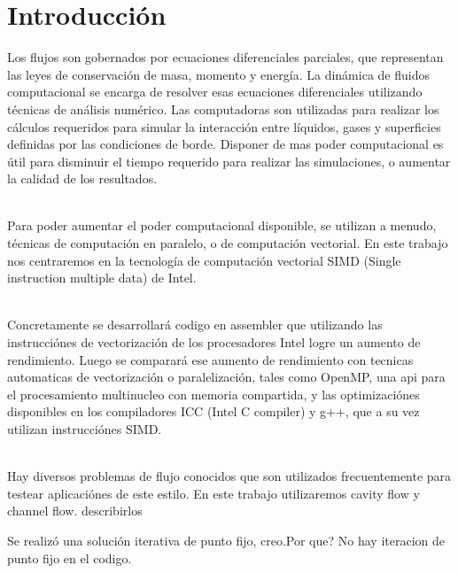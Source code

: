 \section{Introducción}%
Los flujos son gobernados por ecuaciones diferenciales parciales, que representan las leyes de conservación de masa, momento y energía. La dinámica de fluidos computacional se encarga de resolver esas ecuaciones diferenciales utilizando técnicas de análisis numérico. Las computadoras son utilizadas para realizar los cálculos requeridos para simular la interacción entre líquidos, gases y superficies definidas por las condiciones de borde. Disponer de mas poder computacional es útil para disminuir el tiempo requerido para realizar las simulaciones, o aumentar la calidad de los resultados.

~\\
Para poder aumentar el poder computacional disponible, se utilizan a menudo, técnicas de computación en paralelo, o de computación vectorial. En este trabajo nos centraremos en la tecnología de computación vectorial SIMD (Single instruction multiple data) de Intel.

~\\
Concretamente se desarrollará codigo en assembler que utilizando las instrucciónes de vectorización de los procesadores Intel logre un aumento de rendimiento. Luego se comparará ese aumento de rendimiento con tecnicas automaticas de vectorización o paralelización, tales como OpenMP, una api para el procesamiento multinucleo con memoria compartida, y las optimizaciónes disponibles en los compiladores ICC (Intel C compiler) y g++, que a su vez utilizan instrucciónes SIMD.

~\\
Hay diversos problemas de flujo conocidos que son utilizados frecuentemente para testear aplicaciónes de este estilo. En este trabajo utilizaremos cavity flow y channel flow. \colorbox{BurntOrange}{describirlos}


Se realizó una solución iterativa de punto fijo, creo.\colorbox{BurntOrange}{Por que? No hay iteracion de punto fijo en el codigo.}


